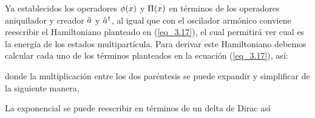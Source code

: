 Ya establecidos los operadores $\phi (x)$ y $\Pi (x)$ en términos de los operadores aniquilador y creador $\hat{a}$ y $\hat{a}^{\dagger}$, al igual que con el oscilador armónico conviene reescribir el Hamiltoniano planteado en (\ref{eq_3.17}), el cual permitirá ver cual es la energía de los estados multipartícula. Para derivar este Hamiltoniano debemos calcular cada uno de los términos planteados en la ecuación (\ref{eq_3.17}), así:

donde la multiplicación entre los dos paréntesis se puede expandir y simplificar de la siguiente manera,



La exponencial se puede reescribir en términos de un delta de Dirac así

\begin{prof}
\end{prof}

